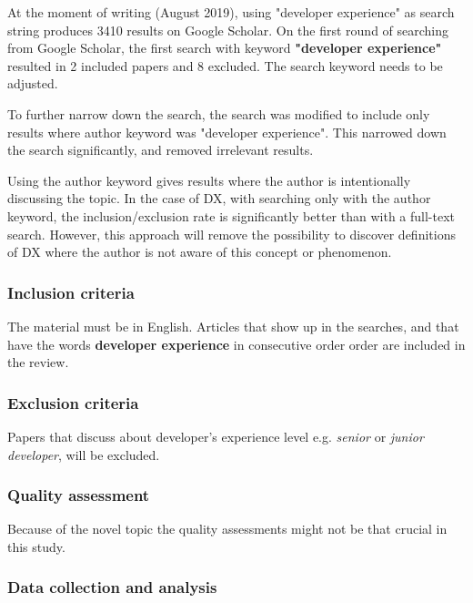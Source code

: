 \documentclass[english, 12pt, a4paper, sci, utf8, a-1b, online]{aaltothesis}
\begin{document}
At the moment of writing (August 2019), using "developer experience" as search string produces 3410 results on Google Scholar. On the first round of searching from Google Scholar, the first search with keyword \textbf{"developer experience"} resulted in 2 included papers and 8 excluded. The search keyword needs to be adjusted.

To further narrow down the search, the search was modified to include only results where author keyword was "developer experience". This narrowed down the search significantly, and removed irrelevant results.

Using the author keyword gives results where the author is intentionally discussing the topic. In the case of DX, with searching only with the author keyword, the inclusion/exclusion rate is significantly better than with a full-text search. However, this approach will remove the possibility to discover definitions of DX where the author is not aware of this concept or phenomenon.  

\subsubsection{Inclusion criteria}

The material must be in English. Articles that show up in the searches, and that have the words \textbf{developer experience} in consecutive order order are included in the review.

\subsubsection{Exclusion criteria}

Papers that discuss about developer's experience level e.g. \textit{senior} or \textit{junior developer}, will be excluded.


\subsubsection{Quality assessment}

Because of the novel topic the quality assessments might not be that crucial in this study.

\subsubsection{Data collection and analysis}
\end{document}
